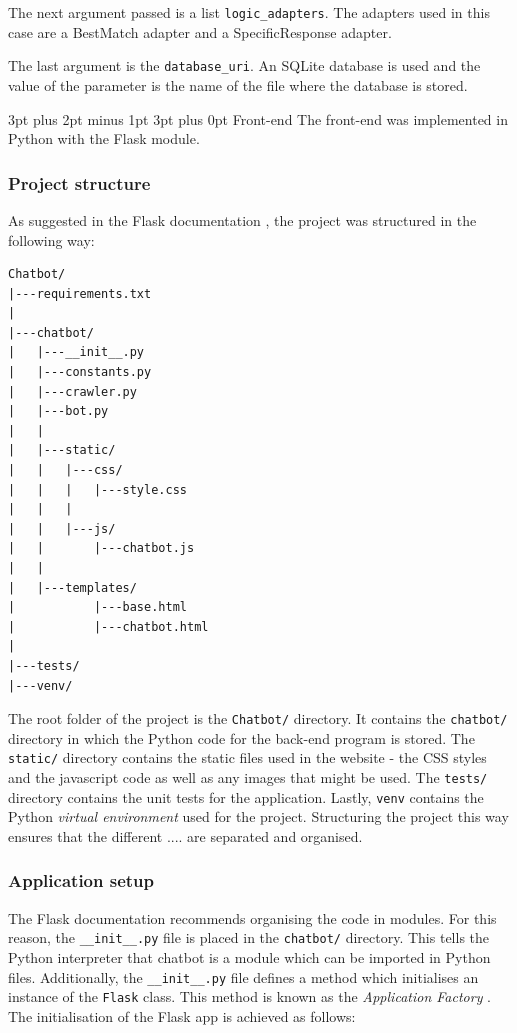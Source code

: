 \documentclass[12pt,a4paper]{article}
\makeatletter
\renewcommand\subsection{\@startsection {subsection}{1}{2mm} %
                                        {3pt plus 2pt minus 1pt} %
                                        {3pt plus 0pt} %
                                        {\normalfont\bfseries}}
\makeatother
\begin{document}
The next argument passed is a list \texttt{logic\_adapters}. The adapters used in this case are a BestMatch adapter and a SpecificResponse adapter.

The last argument is the \texttt{database\_uri}. An SQLite database is used and the value of the parameter is the name of the file where the database is stored.


\subsection{Front-end}
The front-end was implemented in Python with the Flask module.

\subsubsection{Project structure}
As suggested in the Flask documentation \cite{Flask:online}, the project was structured in the following way: 
\begin{Verbatim}[frame=single]
Chatbot/
|---requirements.txt
|   
|---chatbot/
|   |---__init__.py
|   |---constants.py
|   |---crawler.py
|   |---bot.py
|   |   
|   |---static/
|   |   |---css/
|   |   |   |---style.css
|   |   |       
|   |   |---js/
|   |       |---chatbot.js
|   |           
|   |---templates/
|           |---base.html
|           |---chatbot.html
|           
|---tests/
|---venv/    
\end{Verbatim}

The root folder of the project is the \texttt{Chatbot/} directory. It contains the \texttt{chatbot/} directory in which the Python code for the back-end program is stored. The \texttt{static/} directory contains the static files used in the website - the CSS styles and the javascript code as well as any images that might be used. The \texttt{tests/} directory contains the unit tests for the application. Lastly, \texttt{venv} contains the Python \textit{virtual environment} used for the project. Structuring the project this way ensures that the different .... are separated and organised.

\subsubsection{Application setup}
The Flask documentation recommends organising the code in modules. For this reason, the \texttt{\_\_init\_\_.py} file is placed in the \texttt{chatbot/} directory. This tells the Python interpreter that chatbot is a module which can be imported in Python files. Additionally, the \texttt{\_\_init\_\_.py} file defines a method which initialises an instance of the \texttt{Flask} class. This method is known as the \textit{Application Factory} \cite{Flask:online}. The initialisation of the Flask app is achieved as follows:
\end{document}
